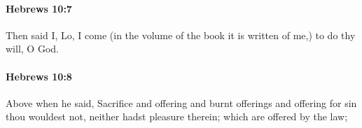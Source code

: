 		\paragraph{Hebrews 10:7} %
			\label{HEBREWS-10-7}

			Then said I, Lo, I come (in the volume of the book it is written of me,) to do thy will, O God.

			\begin{framed}
			\scriptsize
				\begin{compactdesc}
					\item[SBLG] 
				\end{compactdesc}
			\end{framed}

		\paragraph{Hebrews 10:8} %
			\label{HEBREWS-10-8}

			Above when he said, Sacrifice and offering and burnt offerings and offering for sin thou wouldest not, neither hadst pleasure therein; which are offered by the law;

